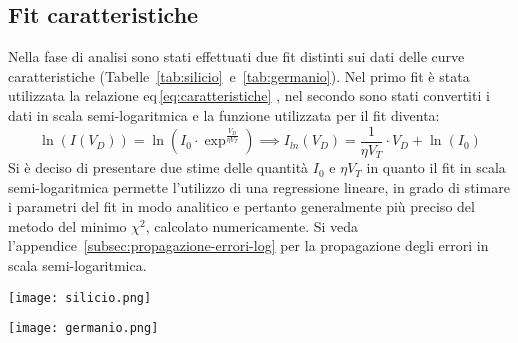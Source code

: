\documentclass[@SRC@/main]{subfiles}
\begin{document}
  \subsection{Fit caratteristiche}
    Nella fase di analisi sono stati effettuati due fit distinti sui dati delle curve
    caratteristiche (Tabelle~\ref{tab:silicio}~e~\ref{tab:germanio}).
    Nel primo fit è stata utilizzata la relazione eq\,\eqref{eq:caratteristiche}
        , nel secondo sono stati convertiti i dati in
        scala semi-logaritmica e la funzione utilizzata per il fit diventa:
    \vspace{0.5cm}
    \begin{equation*}
      \ln  (I(V_D)) = \ln \left( I_0 \cdot \exp^{\frac{V_D}{\eta V_T}} \right) \implies
      I_{ln}(V_D) = \frac{1}{\eta V_T} \cdot V_D + \ln (I_0)
    \end{equation*}
    \newpage
    \noindent Si è deciso di presentare due stime delle quantità $I_{0}$ e $\eta V_{T}$
    in quanto il fit in scala semi-logaritmica
    permette l'utilizzo di una regressione lineare, in grado di stimare i parametri del fit in modo analitico e
    pertanto
    generalmente più preciso del metodo del minimo $\chi^2$, calcolato numericamente.
    Si veda l'appendice~\ref{subsec:propagazione-errori-log} per la propagazione degli
    errori in scala semi-logaritmica.
    \vspace{4pt}
    \newline
    \begin{center}
      \begin{minipage}{.95\textwidth}
        \centering
        \texttt{[image: silicio.png]}
        \label{fig:silicio}
      \end{minipage}
    \end{center}
    \vspace{0.5pt}
    \begin{center}
      \begin{minipage}[t]{.95\textwidth}
        \centering
        \texttt{[image: germanio.png]}
        \label{fig:germanio}
      \end{minipage}
    \end{center}
    \vspace{1.5cm}
\end{document}
